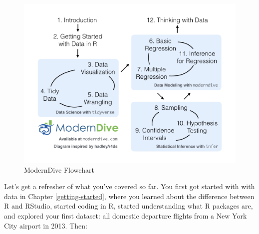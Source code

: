 \documentclass[12pt,]{krantz}
\begin{document}
\begin{figure}

{\centering \includegraphics[width=\textwidth]{images/flowcharts/flowchart/flowchart.002} 

}

\caption{ModernDive Flowchart}\label{fig:moderndive-figure-conclusion}
\end{figure}

Let's get a refresher of what you've covered so far. You first got
started with with data in Chapter \ref{getting-started}, where you
learned about the difference between R and RStudio, started coding in R,
started understanding what R packages are, and explored your first
dataset: all domestic departure flights from a New York City airport in
2013. Then:
\end{document}
